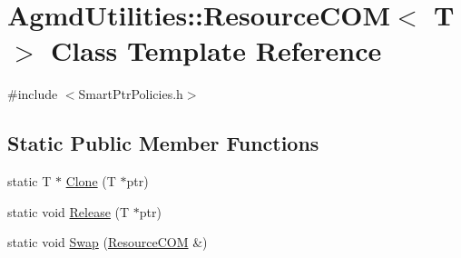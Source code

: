\hypertarget{class_agmd_utilities_1_1_resource_c_o_m}{\section{Agmd\+Utilities\+:\+:Resource\+C\+O\+M$<$ T $>$ Class Template Reference}
\label{class_agmd_utilities_1_1_resource_c_o_m}
}


{\ttfamily \#include $<$Smart\+Ptr\+Policies.\+h$>$}

\subsection*{Static Public Member Functions}
\begin{DoxyCompactItemize}
\item 
static T $\ast$ \hyperlink{class_agmd_utilities_1_1_resource_c_o_m_af809b89f6650575c20e3cc32c0bb4e4c}{Clone} (T $\ast$ptr)
\item 
static void \hyperlink{class_agmd_utilities_1_1_resource_c_o_m_a7db758fb849819863eaeec4445f145bc}{Release} (T $\ast$ptr)
\item 
static void \hyperlink{class_agmd_utilities_1_1_resource_c_o_m_ac562ffe73b51244034d830c020a8f632}{Swap} (\hyperlink{class_agmd_utilities_1_1_resource_c_o_m}{Resource\+C\+O\+M} \&)
\end{DoxyCompactItemize}


